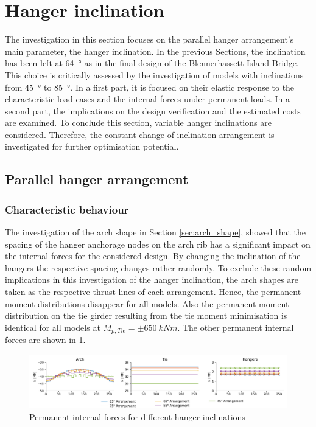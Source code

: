 \newpage
\section{Hanger inclination} \label{sec:inclination}
The investigation in this section focuses on the parallel hanger arrangement's main parameter, the hanger inclination. In the previous Sections, the inclination has been left at \SI{64}{\degree} as in the final design of the Blennerhassett Island Bridge. This choice is critically assessed by the investigation of models with inclinations from \SI{45}{\degree} to \SI{85}{\degree}. In a first part, it is focused on their elastic response to the characteristic load cases and the internal forces under permanent loads.  In a second part, the implications on the design verification and the estimated costs are examined. To conclude this section, variable hanger inclinations are considered. Therefore, the constant change of inclination arrangement is investigated for further optimisation potential.


\subsection{Parallel hanger arrangement}
\subsubsection{Characteristic behaviour}
The investigation of the arch shape in Section \ref{sec:arch_shape}, showed that the spacing of the hanger anchorage nodes on the arch rib has a significant impact on the internal forces for the considered design. By changing the inclination of the hangers the respective spacing changes rather randomly. To exclude these random implications in this investigation of the hanger inclination, the arch shapes are taken as the respective thrust lines of each arrangement. Hence, the permanent moment distributions disappear for all models. Also the permanent moment distribution on the tie girder resulting from the tie moment minimisation is identical for all models at $M_{p,Tie}=\pm \SI{650}{kNm}$. The other permanent internal forces are shown in \cref{fig:inclination_permanent}.

\begin{figure}[H]
    \centering
    \includegraphics[trim={1cm 0 1cm 0},clip, width=\textwidth]{calculations/parallel arrangement comparison/permanent_plot.png}
    \caption{Permanent internal forces for different hanger inclinations}
    \label{fig:inclination_permanent}
\end{figure}

